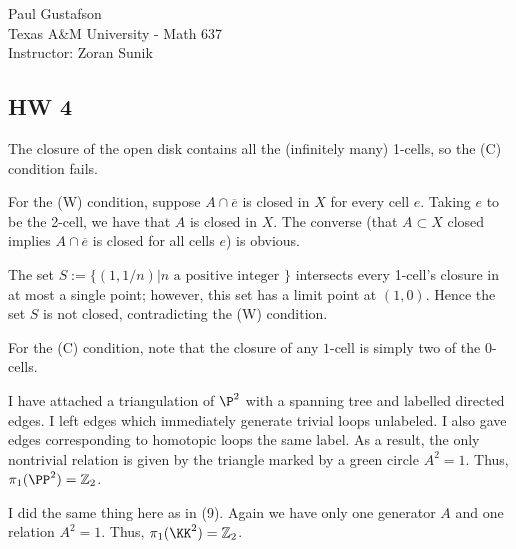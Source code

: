 \documentclass{article}
\begin{document}
\noindent Paul Gustafson\\   
\noindent Texas A\&M University - Math 637\\ 
\noindent Instructor: Zoran Sunik

\subsection*{HW 4}
 The closure of the open disk contains all the (infinitely many) 1-cells, so the (C) condition fails. 

For the (W) condition, suppose $A \cap \overline{e}$ is closed in $X$ for every cell $e$. Taking $e$ to be the 2-cell, we have that $A$ is closed in $X$.
The converse (that $A \subset X$ closed implies $A \cap \overline{e}$ is closed for all cells $e$) is obvious.

 The set $S := \{(1,1/n) \vert n \text{ a positive integer } \}$ intersects every 1-cell's closure in at most a single point; however, this set has a limit point at $(1,0)$.  Hence the set $S$ is not closed, contradicting the (W) condition.

For the (C) condition, note that the closure of any $1$-cell is simply two of the $0$-cells.

 I have attached a triangulation of $\P^2$ with a spanning tree and labelled directed edges.  I left edges which immediately generate trivial loops unlabeled. I also gave edges corresponding to homotopic loops the same label. As a result, the only nontrivial relation is given by the triangle marked by a green circle $A^2 = 1$. Thus, $\pi_1(\PP^2) = \Z_2$.

 I did the same thing here as in (9).  Again we have only one generator $A$ and one relation $A^2 = 1$.  Thus, $\pi_1(\KK^2) = \Z_2$.
\end{document}
